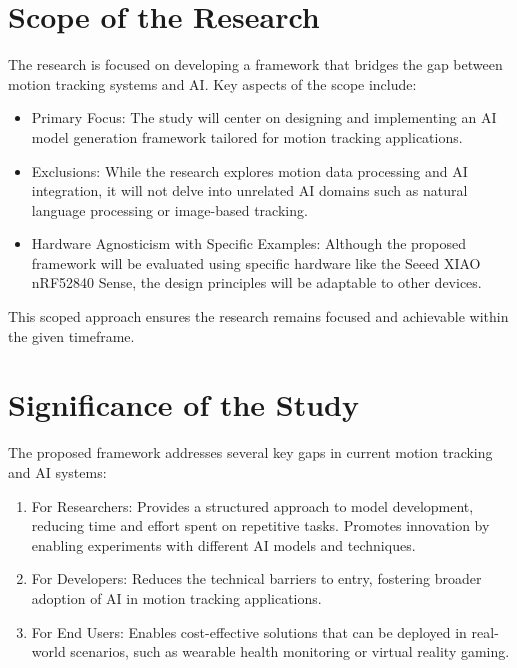 \section{Scope of the Research}
The research is focused on developing a framework that bridges the gap between motion tracking systems and AI. Key aspects of the scope include:

\begin{itemize}
    \item Primary Focus:
    The study will center on designing and implementing an AI model generation framework tailored for motion tracking applications.

    \item Exclusions:
    While the research explores motion data processing and AI integration, it will not delve into unrelated AI domains such as natural language processing or image-based tracking.

    \item Hardware Agnosticism with Specific Examples:
    Although the proposed framework will be evaluated using specific hardware like the Seeed XIAO nRF52840 Sense, the design principles will be adaptable to other devices.
\end{itemize}



This scoped approach ensures the research remains focused and achievable within the given timeframe.

\section{Significance of the Study}
The proposed framework addresses several key gaps in current motion tracking and AI systems:

\begin{enumerate}
    \item For Researchers:
        Provides a structured approach to model development, reducing time and effort spent on repetitive tasks.
        Promotes innovation by enabling experiments with different AI models and techniques.

    \item For Developers:
        Reduces the technical barriers to entry, fostering broader adoption of AI in motion tracking applications.
    
    \item For End Users:
        Enables cost-effective solutions that can be deployed in real-world scenarios, such as wearable health monitoring or virtual reality gaming.
\end{enumerate}

